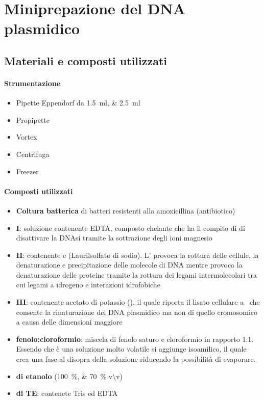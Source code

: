 \section{Miniprepazione del DNA plasmidico}

\subsection{Materiali e composti utilizzati}
\paragraph{Strumentazione}
\begin{itemize}[person]
	\item Pipette \foreignlanguage{german}{Eppendorf} da \qtylist{1.5;2.5}{\ml}
	\item Propipette
	\item \foreignlanguage{english}{Vortex}
	\item Centrifuga
	\item Freezer
\end{itemize}

\paragraph{Composti utilizzati}
\begin{itemize}[person]
	\item \textbf{Coltura batterica} di batteri resistenti alla amoxicillina (antibiotico)
	\item \textbf{\slz I}: soluzione contenente EDTA, composto chelante che ha il compito di di disattivare la DNAsi tramite la sottrazione degli ioni magnesio 
	\item \textbf{\slz II}: contenente  e  (Laurilsolfato di sodio). L' provoca la rottura delle cellule, la denaturazione e precipitazione delle molecole di DNA mentre  provoca la denaturazione delle proteine tramite la rottura dei legami intermolecolari tra cui legami a idrogeno e interazioni idrofobiche
	\item \textbf{\slz III}: contenente acetato di potassio (), il quale riporta il lisato cellulare a \pH\ che consente la rinaturazione del DNA plasmidico ma non di quello cromosomico a causa delle dimensioni maggiore  
	\item \textbf{\slz fenolo:cloroformio}: miscela di fenolo saturo e cloroformio in rapporto 1:1. Essendo che è una soluzione molto volatile si aggiunge isoamilico, il quale crea una fase al disopra della soluzione riducendo la possibilità di evaporare. 
	\item \textbf{\slz di etanolo} (\qtylist{100;70}{\percent} v\textbackslash v)
	\item \textbf{\slz di TE}: contenete Tris ed EDTA
\end{itemize}

